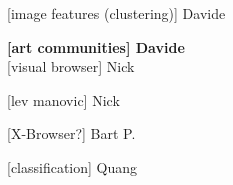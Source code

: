 [image features (clustering)] Davide

\textbf{[art communities] Davide}
\\

[visual browser] Nick

[lev manovic] Nick

[X-Browser?] Bart P.

[classification] Quang